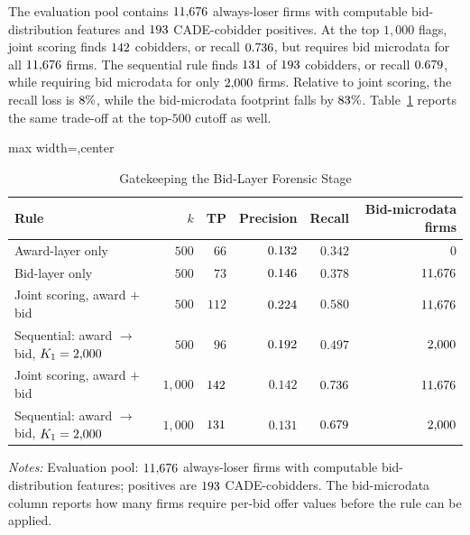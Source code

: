 The evaluation pool contains $11{,}676$ always-loser
firms with computable bid-distribution features and
$193$ CADE-cobidder positives. At the top $1{,}000$
flags, joint scoring finds $142$ cobidders, or
recall $0.736$, but requires bid microdata
for all $11{,}676$ firms. The sequential rule finds
$131$ of $193$ cobidders, or recall
$0.679$, while requiring bid microdata for
only $2{,}000$ firms. Relative to joint scoring, the
recall loss is $8\%$, while the bid-microdata
footprint falls by $83\%$.
Table~\ref{tab:gatekeeper_v18} reports the same trade-off at
the top-$500$ cutoff as well.

\begin{table}[htbp]
\centering
\caption{Gatekeeping the Bid-Layer Forensic Stage}
\label{tab:gatekeeper_v18}
\footnotesize
\begin{adjustbox}{max width=\textwidth,center}
\begin{threeparttable}
\begin{tabular}{p{5.2cm}rrrrr}
\toprule
Rule & $k$ & TP & Precision & Recall & Bid-microdata firms \\
\midrule
Award-layer only & $500$ & $66$ & $0.132$ & $0.342$ & $0$ \\
Bid-layer only & $500$ & $73$ & $0.146$ & $0.378$ & $11{,}676$ \\
Joint scoring, award $+$ bid & $500$ & $112$ & $0.224$ & $0.580$ & $11{,}676$ \\
Sequential: award $\rightarrow$ bid, $K_1=2{,}000$
& $500$ & $96$ & $0.192$ & $0.497$ & $2{,}000$ \\
\midrule
Joint scoring, award $+$ bid & $1{,}000$ & $142$
& $0.142$ & $0.736$ & $11{,}676$ \\
Sequential: award $\rightarrow$ bid, $K_1=2{,}000$
& $1{,}000$ & $131$
& $0.131$ & $0.679$ & $2{,}000$ \\
\bottomrule
\end{tabular}
\begin{tablenotes}
\footnotesize
\item \textit{Notes:} Evaluation pool:
$11{,}676$ always-loser firms with computable
bid-distribution features; positives are $193$
CADE-cobidders. The bid-microdata column reports how many firms
require per-bid offer values before the rule can be applied.
\end{tablenotes}
\end{threeparttable}
\end{adjustbox}
\end{table}

